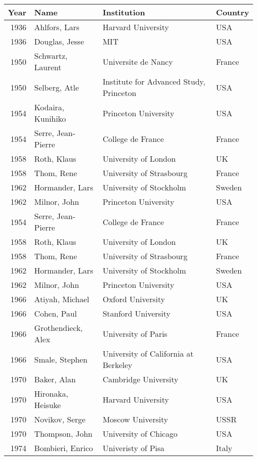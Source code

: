 \begin{tabular}{|r|l|l|l|} \hline

{Year} & {Name} & {Institution} &{Country}
 \\ \hline

1936&Ahlfors, Lars     &Harvard University         &USA \\
1936&Douglas, Jesse    &MIT              &USA \\
1950&Schwartz, Laurent &Universite de Nancy       &France \\
1950&Selberg, Atle     &Institute for Advanced Study, Princeton&USA \\
1954&Kodaira, Kunihiko &Princeton University      &USA \\
1954&Serre, Jean-Pierre&College de France&France \\
1958&Roth, Klaus       &University of London      &UK \\
1958&Thom, Rene        &University of Strasbourg  &France \\
1962&Hormander, Lars   &University of Stockholm   &Sweden \\
1962&Milnor, John      &Princeton University      &USA \\
1954&Serre, Jean-Pierre&College de France&France \\
1958&Roth, Klaus       &University of London      &UK \\
1958&Thom, Rene        &University of Strasbourg  &France \\
1962&Hormander, Lars   &University of Stockholm   &Sweden \\
1962&Milnor, John      &Princeton University      &USA \\
1966&Atiyah, Michael   &Oxford University         &UK \\
1966&Cohen, Paul       &Stanford University       &USA \\
1966&Grothendieck, Alex&University of Paris       &France \\
1966&Smale, Stephen    &University of California at Berkeley      &USA \\
1970&Baker, Alan       &Cambridge University      &UK \\
1970&Hironaka, Heisuke &Harvard University        &USA \\
1970&Novikov, Serge    &Moscow University         &USSR \\
1970&Thompson, John    &University of Chicago     &USA \\
1974&Bombieri, Enrico  &Univeristy of Pisa        &Italy \\

\end{tabular}
